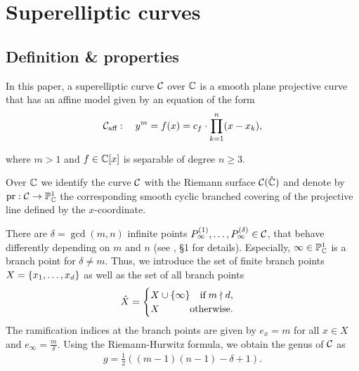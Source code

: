 \documentclass[main.tex]{subfiles}
\begin{document}
  \section{Superelliptic curves}\label{sec:se_curves}

  \subsection{Definition \& properties}\label{subsec:se_def}

    \begin{defn}\label{def:se_curve}
    In this paper, a superelliptic curve $\mathcal{C}$ over $\mathbb{C}$ is a smooth plane projective curve that has an affine model given by an equation of the form
   \begin{align}\label{eq:aff_model}
    \mathcal{C}_{\text{aff}} : \quad y^m = f(x) =  c_f \cdot \prod_{k=1}^n (x-x_k),
   \end{align}
   \end{defn}
   where $m > 1$ and $f \in \mathbb{C}[x]$ is separable of degree $n \ge 3$.
   
   Over $\mathbb{C}$ we identify the curve $\mathcal{C}$ with the Riemann surface $\mathcal{C}(\hat{\mathbb{C}})$ and denote by $\operatorname{pr} : \mathcal{C} \rightarrow \mathbb{P}^1_{\mathbb{C}}$ the corresponding smooth cyclic branched covering of the projective line
   defined by the $x$-coordinate.

  There are $\delta = \gcd(m,n)$ infinite points $P_{\infty}^{(1)},\dots,P_{\infty}^{(\delta)} \in \mathcal{C}$, that behave differently depending on $m$ and $n$ (see \cite{CT1996}, \S 1 for details).
  Especially, $\infty \in \mathbb{P}^1_{\mathbb{C}}$ is a branch point for $\delta \ne m$. Thus, we introduce the set of finite branch points $X = \{ x_1,\dots,x_d \}$ as well as the set of all branch points
  \begin{align}\label{eq:branch_points}
         \hat{X} = \begin{cases}   X \cup \{ \infty \} \quad \text{if} \; m  \nmid  d,\\
         X \hfill \text{otherwise.}
     \end{cases}
  \end{align}
  The ramification indices at the branch points are given by $e_x = m$ for all $x \in X$ and $e_{\infty} = \frac{m}{\delta}$. Using the
  Riemann-Hurwitz formula, we obtain the genus of $\mathcal{C}$ as
  \begin{align}\label{eq:genus}
    g = \frac{1}{2}( (m-1)(n-1) - \delta + 1).
  \end{align}
\end{document}
